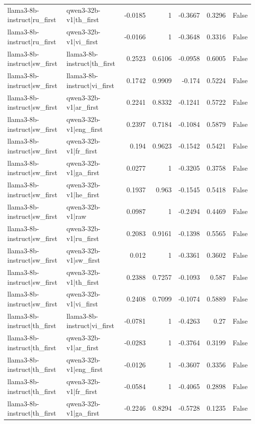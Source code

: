 \begin{table}
\begin{tabular}{l l r r r r l}
llama3-8b-instruct|ru_first & qwen3-32b-v1|th_first & -0.0185 & 1 & -0.3667 & 0.3296 & False \\
llama3-8b-instruct|ru_first & qwen3-32b-v1|vi_first & -0.0166 & 1 & -0.3648 & 0.3316 & False \\
llama3-8b-instruct|sw_first & llama3-8b-instruct|th_first & 0.2523 & 0.6106 & -0.0958 & 0.6005 & False \\
llama3-8b-instruct|sw_first & llama3-8b-instruct|vi_first & 0.1742 & 0.9909 & -0.174 & 0.5224 & False \\
llama3-8b-instruct|sw_first & qwen3-32b-v1|ar_first & 0.2241 & 0.8332 & -0.1241 & 0.5722 & False \\
llama3-8b-instruct|sw_first & qwen3-32b-v1|eng_first & 0.2397 & 0.7184 & -0.1084 & 0.5879 & False \\
llama3-8b-instruct|sw_first & qwen3-32b-v1|fr_first & 0.194 & 0.9623 & -0.1542 & 0.5421 & False \\
llama3-8b-instruct|sw_first & qwen3-32b-v1|ga_first & 0.0277 & 1 & -0.3205 & 0.3758 & False \\
llama3-8b-instruct|sw_first & qwen3-32b-v1|he_first & 0.1937 & 0.963 & -0.1545 & 0.5418 & False \\
llama3-8b-instruct|sw_first & qwen3-32b-v1|raw & 0.0987 & 1 & -0.2494 & 0.4469 & False \\
llama3-8b-instruct|sw_first & qwen3-32b-v1|ru_first & 0.2083 & 0.9161 & -0.1398 & 0.5565 & False \\
llama3-8b-instruct|sw_first & qwen3-32b-v1|sw_first & 0.012 & 1 & -0.3361 & 0.3602 & False \\
llama3-8b-instruct|sw_first & qwen3-32b-v1|th_first & 0.2388 & 0.7257 & -0.1093 & 0.587 & False \\
llama3-8b-instruct|sw_first & qwen3-32b-v1|vi_first & 0.2408 & 0.7099 & -0.1074 & 0.5889 & False \\
llama3-8b-instruct|th_first & llama3-8b-instruct|vi_first & -0.0781 & 1 & -0.4263 & 0.27 & False \\
llama3-8b-instruct|th_first & qwen3-32b-v1|ar_first & -0.0283 & 1 & -0.3764 & 0.3199 & False \\
llama3-8b-instruct|th_first & qwen3-32b-v1|eng_first & -0.0126 & 1 & -0.3607 & 0.3356 & False \\
llama3-8b-instruct|th_first & qwen3-32b-v1|fr_first & -0.0584 & 1 & -0.4065 & 0.2898 & False \\
llama3-8b-instruct|th_first & qwen3-32b-v1|ga_first & -0.2246 & 0.8294 & -0.5728 & 0.1235 & False \\

\end{tabular}
\end{table}
